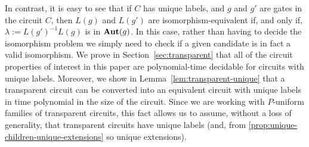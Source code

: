 \documentclass[../paper.tex]{subfiles}
\begin{document}
In contrast, it is easy to see that if $C$ has unique labels, and $g$ and $g'$
are gates in the circuit $C$, then $L(g)$ and $L(g')$ are isomorphism-equivalent
if, and only if, $\lambda := L(g')^{-1}L(g)$ is in $\text{\textbf{Aut}}(g)$. In this case,
rather than having to decide the isomorphism problem we simply need to check if a given
candidate is in fact a valid isomorphism. We prove in
Section~\ref{sec:transparent} that all of the circuit properties of interest in
this paper are polynomial-time decidable for circuits with unique labels.
Moreover, we show in Lemma~\ref{lem:transparent-unique} that a
transparent circuit can be converted into an equivalent circuit with unique
labels in time polynomial in the size of the circuit. Since we are working with
$P$-uniform families of transparent circuits, this fact allows us to assume,
without a loss of generality, that transparent circuits have unique labels (and,
from \ref{prop:unique-children-unique-extensions} so unique extensions).



\end{document}
